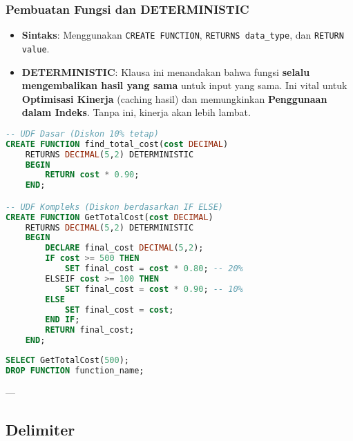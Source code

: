 \documentclass{article}
\begin{document}
\subsubsection{Pembuatan Fungsi dan DETERMINISTIC}
\begin{itemize}
    \item \textbf{Sintaks}: Menggunakan \texttt{CREATE FUNCTION}, \texttt{RETURNS data\_type}, dan \texttt{RETURN value}.
    \item \textbf{DETERMINISTIC}: Klausa ini menandakan bahwa fungsi \textbf{selalu mengembalikan hasil yang sama} untuk input yang sama. Ini vital untuk \textbf{Optimisasi Kinerja} (caching hasil) dan memungkinkan \textbf{Penggunaan dalam Indeks}. Tanpa ini, kinerja akan lebih lambat.
\end{itemize}
\begin{lstlisting}[language=SQL, caption={Sintaks UDF Dasar dan Kompleks}, captionpos=b]
-- UDF Dasar (Diskon 10% tetap)
CREATE FUNCTION find_total_cost(cost DECIMAL)
    RETURNS DECIMAL(5,2) DETERMINISTIC
    BEGIN
        RETURN cost * 0.90; 
    END;

-- UDF Kompleks (Diskon berdasarkan IF ELSE)
CREATE FUNCTION GetTotalCost(cost DECIMAL)
    RETURNS DECIMAL(5,2) DETERMINISTIC
    BEGIN
        DECLARE final_cost DECIMAL(5,2);
        IF cost >= 500 THEN
            SET final_cost = cost * 0.80; -- 20%
        ELSEIF cost >= 100 THEN
            SET final_cost = cost * 0.90; -- 10%
        ELSE
            SET final_cost = cost; 
        END IF;
        RETURN final_cost;
    END;
\end{lstlisting}
\begin{lstlisting}[language=SQL, caption={Pengujian dan Penghapusan Fungsi}, captionpos=b]
SELECT GetTotalCost(500); 
DROP FUNCTION function_name;
\end{lstlisting}

---

\subsection{Delimiter}
\end{document}
